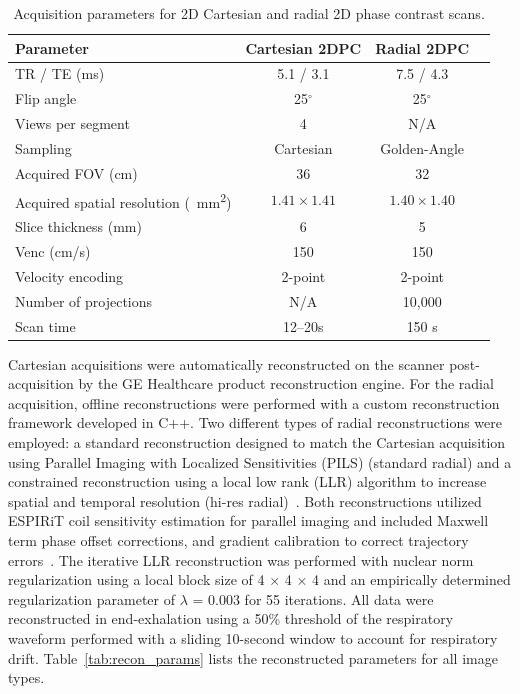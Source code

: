 \begin{table}[ht]
    \centering
    \caption[LIFE study scan parameters]{Acquisition parameters for 2D Cartesian and radial 2D phase contrast scans.}\label{tab:LIFE_scan_params}
    \small
    \ifFinal{}
    \fi
    \vspace{0.25cm}
    \begin{tabular}{lccc}
    \toprule
    \textbf{Parameter} & \textbf{Cartesian 2DPC} & \textbf{Radial 2DPC} \\
    \midrule
    TR / TE (ms) & 5.1 / 3.1 & 7.5 / 4.3 \\
    Flip angle & 25$^\circ$ & 25$^\circ$ \\
    Views per segment & 4 & N/A \\
    Sampling & Cartesian & Golden-Angle \\
    Acquired FOV (cm) & 36 & 32 \\
    Acquired spatial resolution (\qty{}{\mm^2}) & $1.41 \times 1.41$ & $1.40 \times 1.40$ \\
    Slice thickness (mm) & 6 & 5 \\
    Venc (cm/s) & 150 & 150 \\
    Velocity encoding & 2-point & 2-point \\
    Number of projections & N/A & 10,000 \\
    Scan time & 12--20s & 150 s \\
    \bottomrule
    \end{tabular}
\end{table}

Cartesian acquisitions were automatically reconstructed on the scanner post-acquisition by the GE Healthcare product reconstruction engine. For the radial acquisition, offline reconstructions were performed with a custom reconstruction framework developed in C++. Two different types of radial reconstructions were employed: a standard reconstruction designed to match the Cartesian acquisition using Parallel Imaging with Localized Sensitivities (PILS) (standard radial) and a constrained reconstruction using a local low rank (LLR) algorithm to increase spatial and temporal resolution (hi-res radial)~\cite{griswoldPartiallyParallelImaging2000, jimenezFeasibilityHighSpatiotemporal2018,haldarLowrankApproximationsDynamic2011}. Both reconstructions utilized ESPIRiT coil sensitivity estimation for parallel imaging and included Maxwell term phase offset corrections, and gradient calibration to correct trajectory errors~\cite{ueckerESPIRiTEigenvalueApproach2014, bernsteinConcomitantGradientTerms1998, johnsonImproved3DPhase2008}. The iterative LLR reconstruction was performed with nuclear norm regularization using a local block size of 4 $\times$ 4 $\times$ 4 and an empirically determined regularization parameter of $\lambda$ = 0.003 for 55 iterations. All data were reconstructed in end-exhalation using a 50\% threshold of the respiratory waveform performed with a sliding 10-second window to account for respiratory drift. Table~\ref{tab:recon_params} lists the reconstructed parameters for all image types.

